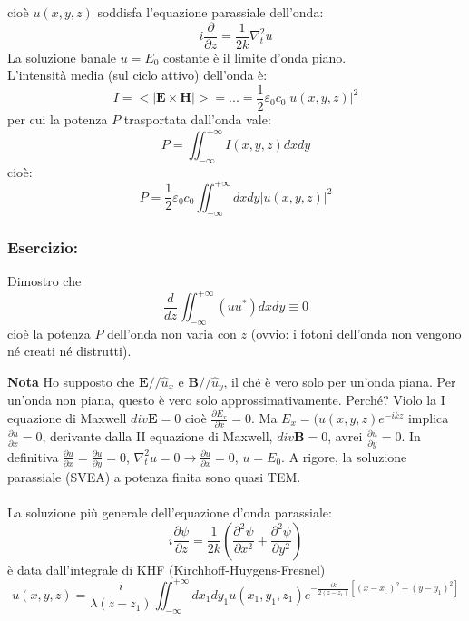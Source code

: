\documentclass{book}
\def \*#1{\mathbf{#1}}
\def \p {\partial}
\def \l {\lambda}
\theoremstyle{remark}
\begin{document}
cioè $u(x,y,z)$ soddisfa l'equazione parassiale dell'onda:
\begin{equation*}
i\frac{\partial}{\partial z} = \frac{1}{2k} \nabla_t^2 u
\end{equation*}
La soluzione banale $u = E_0$ costante è il limite d'onda piano.\\
L'intensità media (sul ciclo attivo) dell'onda è:
\begin{equation*}
I = <|\*E \times \*H|> = ... = \frac{1}{2} \varepsilon_0 c_0 |u(x,y,z)|^2
\end{equation*}
per cui la potenza $P$ trasportata dall'onda vale:
\begin{equation*}
P = \iint_{-\infty}^{+\infty} I(x,y,z) dxdy
\end{equation*}
cioè:
\begin{equation*}
P = \frac{1}{2} \varepsilon_0 c_0 \iint_{-\infty}^{+\infty} dxdy |u(x,y,z)|^2
\end{equation*}
\subsubsection{Esercizio:}
Dimostro che 
\begin{equation*}
\frac{d}{dz} \iint_{-\infty}^{+\infty} (uu^*) dxdy \equiv 0
\end{equation*}
cioè la potenza $P$ dell'onda non varia con $z$ (ovvio: i fotoni dell'onda non vengono né creati né distrutti).

\textbf{Nota} Ho supposto che $\*E // \hat{u}_x$ e $\*B // \hat{u}_y$, il ché è vero solo per un'onda piana. Per un'onda non piana, questo è vero solo approssimativamente. Perché? Violo la I equazione di Maxwell $div \*E = 0$ cioè $\frac{\partial E_x}{\partial x} = 0$. Ma $E_x = (u(x,y,z) e^{-ikz}$  implica $\frac{\partial u}{\partial x} = 0$, derivante dalla II equazione di Maxwell, $div \*B = 0$, avrei $\frac{\partial u}{\partial y} = 0$. In definitiva $\frac{\partial u}{\partial x} = \frac{\partial u}{\partial y} = 0$, $\nabla_t^2 u = 0 \rightarrow \frac{\partial u}{\partial x} = 0$, $u = E_0$. A rigore, la soluzione parassiale (SVEA) a potenza finita sono quasi TEM.\\
\\
La soluzione più generale dell'equazione d'onda parassiale:
\begin{equation*}
i \frac{\p \psi}{\p z} = \frac{1}{2k} \left(\frac{\p^2 \psi}{\p x^2} + \frac{\p^2 \psi}{\p y^2} \right)
\end{equation*}
è data dall'integrale di KHF (Kirchhoff-Huygens-Fresnel)
\begin{equation*}
u(x,y,z) = \frac{i}{\l (z - z_1)} \iint_{-\infty}^{+\infty} dx_1dy_1 u(x_1,y_1,z_1) e^{-\frac{ik}{2(z-z_1)} \left[ (x-x_1)^2 + (y-y_1)^2 \right]}
\end{equation*}
\end{document}
